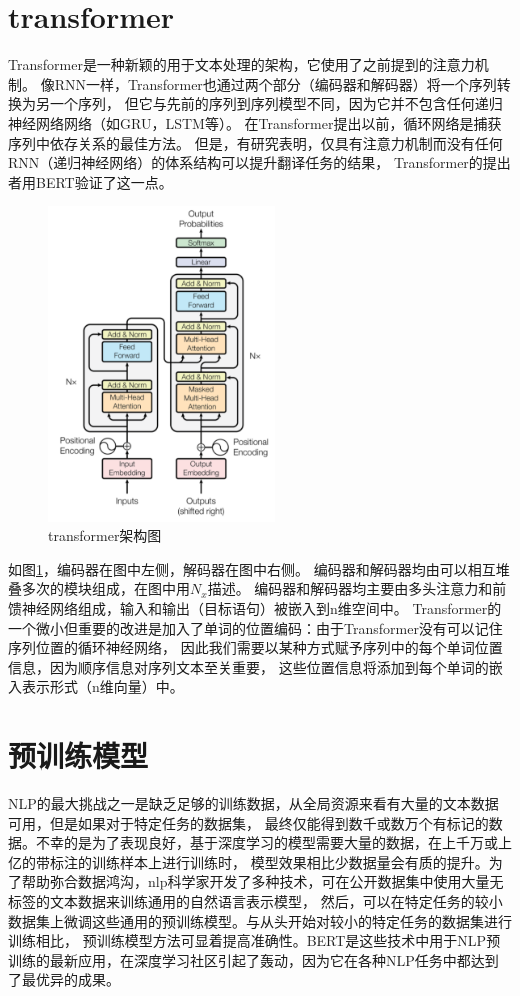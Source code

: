 \section{transformer}
Transformer\cite{vaswani2017attention}是一种新颖的用于文本处理的架构，它使用了之前提到的注意力机制。
像RNN一样，Transformer也通过两个部分（编码器和解码器）将一个序列转换为另一个序列，
但它与先前的序列到序列模型不同，因为它并不包含任何递归神经网络网络（如GRU，LSTM等）。
在Transformer提出以前，循环网络是捕获序列中依存关系的最佳方法。 
但是，有研究表明，仅具有注意力机制而没有任何RNN（递归神经网络）的体系结构可以提升翻译任务的结果，
Transformer的提出者用BERT验证了这一点。

\begin{figure}[htbp]
  \centering
  \includegraphics[width=6cm]{./images/transformer.png}
  \caption{transformer架构图\cite{vaswani2017attention}}
  \label{fig:transformer}
\end{figure}

如图\ref{fig:transformer}，编码器在图中左侧，解码器在图中右侧。 
编码器和解码器均由可以相互堆叠多次的模块组成，在图中用$N_x$描述。 
编码器和解码器均主要由多头注意力和前馈神经网络组成，输入和输出（目标语句）被嵌入到n维空间中。
Transformer的一个微小但重要的改进是加入了单词的位置编码：由于Transformer没有可以记住序列位置的循环神经网络，
因此我们需要以某种方式赋予序列中的每个单词位置信息，因为顺序信息对序列文本至关重要，
这些位置信息将添加到每个单词的嵌入表示形式（n维向量）中。

\section{预训练模型}
NLP的最大挑战之一是缺乏足够的训练数据，从全局资源来看有大量的文本数据可用，但是如果对于特定任务的数据集，
最终仅能得到数千或数万个有标记的数据。不幸的是为了表现良好，基于深度学习的模型需要大量的数据，在上千万或上亿的带标注的训练样本上进行训练时，
模型效果相比少数据量会有质的提升。为了帮助弥合数据鸿沟，nlp科学家开发了多种技术，可在公开数据集中使用大量无标签的文本数据来训练通用的自然语言表示模型，
然后，可以在特定任务的较小数据集上微调这些通用的预训练模型。与从头开始对较小的特定任务的数据集进行训练相比，
预训练模型方法可显着提高准确性。BERT\cite{devlin2018bert}是这些技术中用于NLP预训练的最新应用，在深度学习社区引起了轰动，因为它在各种NLP任务中都达到了最优异的成果。

